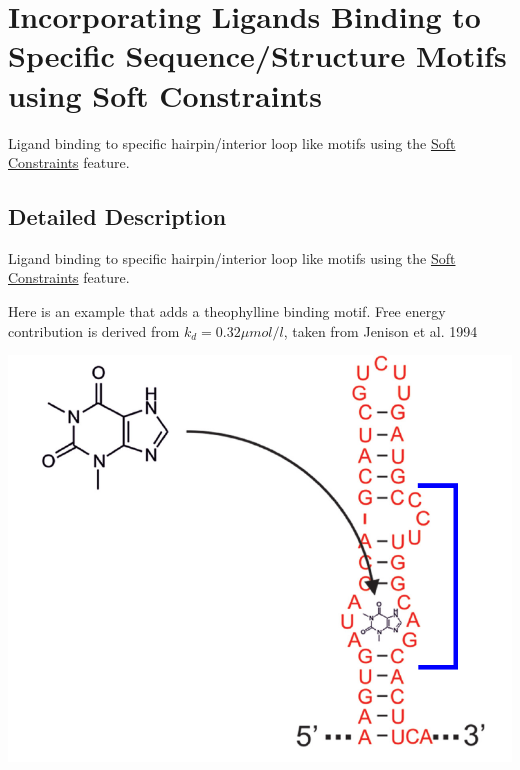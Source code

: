 \hypertarget{group__constraints__ligand}{}\section{Incorporating Ligands Binding to Specific Sequence/\+Structure Motifs using Soft Constraints}
\label{group__constraints__ligand}


Ligand binding to specific hairpin/interior loop like motifs using the \hyperlink{group__soft__constraints}{Soft Constraints} feature.  




\subsection{Detailed Description}
Ligand binding to specific hairpin/interior loop like motifs using the \hyperlink{group__soft__constraints}{Soft Constraints} feature. 

Here is an example that adds a theophylline binding motif. Free energy contribution is derived from $k_d = 0.32 \mu mol / l $, taken from Jenison et al. 1994

 
\begin{DoxyImageNoCaption}
  \mbox{\includegraphics[width=\textwidth,height=\textheight/2,keepaspectratio=true]{theo_aptamer}}
\end{DoxyImageNoCaption}



